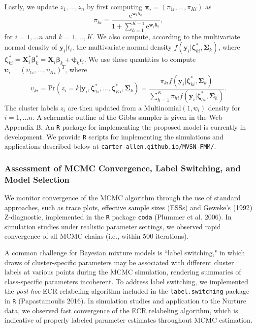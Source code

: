 \documentclass[useAMS,referee]{biom}
\begin{document}
Lastly, we update $z_1,...,z_n$ by first computing $\boldsymbol\pi_i = (\pi_{1i},...,\pi_{Ki})$ as
$$\pi_{ki} = \frac{\text{e}^{\mathbf{w}_i\boldsymbol\delta_k}}{1 + \sum_{h=1}^{K-1} \text{e}^{\mathbf{w}_i\boldsymbol\delta_h}},$$ 
for $i = 1,...n$ and $k = 1,...,K$. We also compute, according to the multivariate normal density of $\mathbf{y}_i|t_i$, the multivariate normal density $f(\mathbf{y}_i|\boldsymbol\zeta^*_{ki},\boldsymbol\Sigma_k)$, where $\boldsymbol\zeta^*_{ki} = \mathbf{X}_i^*\boldsymbol\beta^*_k = \mathbf{X}_i \boldsymbol\beta_k + \boldsymbol\psi_k t_i$. We use these quantities to compute $\boldsymbol\upsilon_{i} = (\upsilon_{1i},...,\upsilon_{Ki})^T$, where  
$$\upsilon_{ki} = \text{Pr}(z_i = k|\mathbf{y}_i,\boldsymbol\zeta^*_{1i},...,\boldsymbol\zeta^*_{Ki},\boldsymbol\Sigma_k) = \frac{\pi_{ki}f(\mathbf{y}_i|\boldsymbol\zeta^*_{ki},\boldsymbol\Sigma_k)}{\sum_{h = 1}^{K} \pi_{hi}f(\mathbf{y}_i|\boldsymbol\zeta^*_{hi},\boldsymbol\Sigma_h)}.$$
The cluster labels $z_i$ are then updated from a $\text{Multinomial}(1,\boldsymbol\upsilon_i)$ density for $i = 1,...n$. A schematic outline of the Gibbs sampler is given in the Web Appendix B. An \texttt{R} package for implementing the proposed model is currently in development. We provide \texttt{R} scripts for implementing the simulations and applications described below at 
\texttt{carter-allen.github.io/MVSN-FMM/}.

\subsubsection{Assessment of MCMC Convergence, Label Switching, and Model Selection}
\label{s:mcmcmisc}

We monitor convergence of the MCMC algorithm through the use of standard approaches, such as trace plots, effective sample sizes (ESSs) and Geweke's (1992) Z-diagnostic, implemented in the \texttt{R} package \texttt{coda} (Plummer et al. 2006). In simulation studies under realistic parameter settings, we observed rapid convergence of all MCMC chains (i.e., within 500 iterations).

A common challenge for Bayesian mixture models is ``label switching," in which draws of cluster-specific parameters may be associated with different cluster labels at various points during the MCMC simulation, rendering summaries of class-specific parameters incoherent. To address label switching, we implemented the \textit{post hoc} ECR relabeling algorithm included in the \texttt{label.switching} package in \texttt{R} (Papastamoulis 2016). In simulation studies and application to the Nurture data, we observed fast convergence of the ECR relabeling algorithm, which is indicative of properly labeled parameter estimates throughout MCMC estimation.
\end{document}
